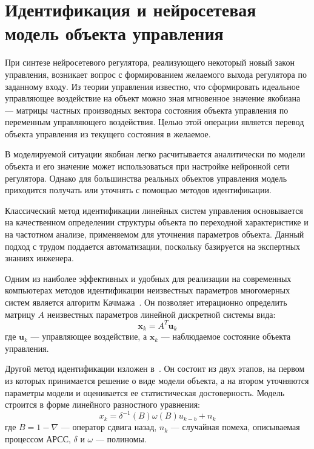 \section{Идентификация и нейросетевая модель объекта управления}%
\label{identif_and_nnp}

При синтезе нейросетевого регулятора, реализующего некоторый новый
закон управления, возникает вопрос с формированием желаемого выхода
регулятора по заданному входу.  Из теории управления известно, что
сформировать идеальное управляющее воздействие на объект можно зная
мгновенное значение якобиана --- матрицы частных производных вектора
состояния объекта управления по переменным управляющего воздействия.
Целью этой операции является перевод объекта управления из текущего
состояния в желаемое.

В моделируемой ситуации якобиан легко расчитывается аналитически по
модели объекта и его значение может использоваться при настройке
нейронной сети регулятора.  Однако для большинства реальных объектов
управления модель приходится получать или уточнять с помощью методов
идентификации.

Классический метод идентификации линейных систем управления
основывается на качественном определении структуры объекта по
переходной характеристике и на частотном анализе, применяемом для
уточнения параметров объекта.  Данный подход с трудом поддается
автоматизации, поскольку базируется на экспертных знаниях инженера.

Одним из наиболее эффективных и удобных для реализации на современных
компьютерах методов идентификации неизвестных параметров многомерных
систем является алгоритм Качмажа~\cite{bolonchin91}.  Он позволяет
итерационно определить матрицу $A$ неизвестных параметров линейной
дискретной системы вида:
\begin{equation}\label{kachmaj}
\mathbf{x}_k=A^T \mathbf{u}_k
\end{equation} где $\mathbf{u}_k$ --- управляющее воздействие, а
$\mathbf{x}_k$ --- наблюдаемое состояние объекта управления.

Другой метод идентификации изложен в~\cite{boxjenk74}.  Он состоит из
двух этапов, на первом из которых принимается решение о виде модели
объекта, а на втором уточняются параметры модели и оценивается ее
статистическая достоверность.  Модель строится в форме линейного
разностного уравнения:
\begin{equation}\label{arima}
x_k=\delta^{-1}(B)\omega(B) u_{k-b} + n_k
\end{equation} где $B=1-\nabla$ --- оператор сдвига назад, $n_k$ ---
случайная помеха, описываемая процессом АРСС, $\delta$ и $\omega$ ---
полиномы.


